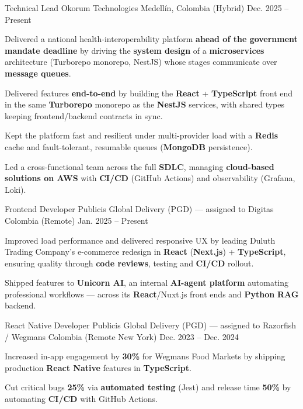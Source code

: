 \newcommand{\quotes}[1]{``#1''}

\begin{cventries}

  \cventry
  {Technical Lead}
  {Okorum Technologies}
  {Medellín, Colombia (Hybrid)}
  {Dec. 2025 -- Present}
  {
    \begin{cvitems}
      \item {Delivered a national health-interoperability platform \textbf{ahead of the government mandate deadline} by driving the \textbf{system design} of a \textbf{microservices} architecture (Turborepo monorepo, NestJS) whose stages communicate over \textbf{message queues}.}
      \item {Delivered features \textbf{end-to-end} by building the \textbf{React} + \textbf{TypeScript} front end in the same \textbf{Turborepo} monorepo as the \textbf{NestJS} services, with shared types keeping frontend/backend contracts in sync.}
      \item {Kept the platform fast and resilient under multi-provider load with a \textbf{Redis} cache and fault-tolerant, resumable queues (\textbf{MongoDB} persistence).}
      \item {Led a cross-functional team across the full \textbf{SDLC}, managing \textbf{cloud-based solutions on AWS} with \textbf{CI/CD} (GitHub Actions) and observability (Grafana, Loki).}
    \end{cvitems}
  }

  \cventry
  {Frontend Developer}
  {Publicis Global Delivery (PGD) — assigned to Digitas}
  {Colombia (Remote)}
  {Jan. 2025 -- Present}
  {
    \begin{cvitems}
      \item {Improved load performance and delivered responsive UX by leading Duluth Trading Company's e-commerce redesign in \textbf{React} (\textbf{Next.js}) + \textbf{TypeScript}, ensuring quality through \textbf{code reviews}, testing and \textbf{CI/CD} rollout.}
      \item {Shipped features to \textbf{Unicorn AI}, an internal \textbf{AI-agent platform} automating professional workflows --- across its \textbf{React}/Nuxt.js front ends and \textbf{Python} \textbf{RAG} backend.}
    \end{cvitems}
  }

  \cventry
  {React Native Developer}
  {Publicis Global Delivery (PGD) — assigned to Razorfish / Wegmans}
  {Colombia (Remote \textemdash{} New York)}
  {Dec. 2023 -- Dec. 2024}
  {
    \begin{cvitems}
      \item {Increased in-app engagement by \textbf{30\%} for Wegmans Food Markets by shipping production \textbf{React Native} features in \textbf{TypeScript}.}
      \item {Cut critical bugs \textbf{25\%} via \textbf{automated testing} (Jest) and release time \textbf{50\%} by automating \textbf{CI/CD} with GitHub Actions.}
    \end{cvitems}
  }


\end{cventries}
